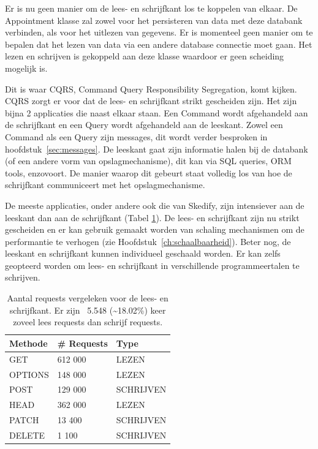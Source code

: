 
Er is nu geen manier om de lees- en schrijfkant los te koppelen van elkaar. De Appointment klasse zal zowel voor het persisteren van data met deze databank verbinden, als voor het uitlezen van gegevens. Er is momenteel geen manier om te bepalen dat het lezen van data via een andere database connectie moet gaan. Het lezen en schrijven is gekoppeld aan deze klasse waardoor er geen scheiding mogelijk is.

Dit is waar \gls{CQRS}, Command Query Responsibility Segregation, komt kijken. \gls{CQRS} zorgt er voor dat de lees- en schrijfkant strikt gescheiden zijn. Het zijn bijna 2 applicaties die naast elkaar staan. Een Command wordt afgehandeld aan de schrijfkant en een Query wordt afgehandeld aan de leeskant. Zowel een Command als een Query zijn messages, dit wordt verder besproken in hoofdstuk~\ref{sec:messages}. De leeskant gaat zijn informatie halen bij de databank (of een andere vorm van opslagmechanisme), dit kan via \gls{SQL} queries, \gls{ORM} tools, enzovoort. De manier waarop dit gebeurt staat volledig los van hoe de schrijfkant communiceert met het opslagmechanisme.

De meeste applicaties, onder andere ook die van Skedify, zijn intensiever aan de leeskant dan aan de schrijfkant (Tabel \ref{cqrs-read-writes}). De lees- en schrijfkant zijn nu strikt gescheiden en er kan gebruik gemaakt worden van schaling mechanismen om de performantie te verhogen (zie Hoofdstuk~\ref{ch:schaalbaarheid}). Beter nog, de leeskant en schrijfkant kunnen individueel geschaald worden. Er kan zelfs geopteerd worden om lees- en schrijfkant in verschillende programmeertalen te schrijven.

\begin{table}[h]
\centering
\caption[Aantal requests vergeleken voor de lees- en schrijfkant.]{Aantal requests vergeleken voor de lees- en schrijfkant. Er zijn ~5.548 (\textasciitilde18.02\%) keer zoveel lees requests dan schrijf requests.}
\begin{tabular}{lll} \toprule
Methode & \# Requests & Type        \\ \midrule
GET     & 612 000     & LEZEN       \\
OPTIONS & 148 000     & LEZEN       \\
POST    & 129 000     & SCHRIJVEN   \\
HEAD    & 362 000     & LEZEN       \\
PATCH   & 13 400      & SCHRIJVEN   \\
DELETE  & 1 100       & SCHRIJVEN   \\ \bottomrule
\end{tabular}
\label{cqrs-read-writes}
\end{table}

